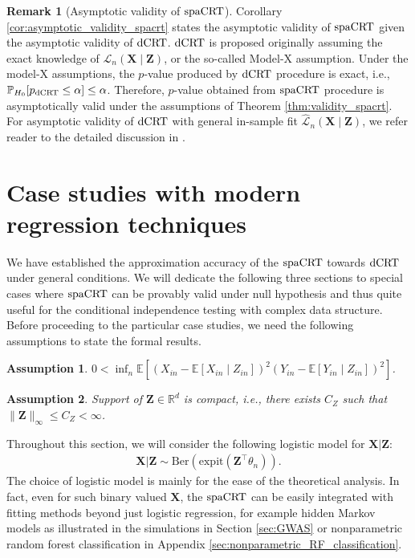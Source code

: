 \documentclass[12pt]{article}
\newtheorem{assumption}{Assumption}
\theoremstyle{definition}
\newtheorem{remark}{Remark}
\def\P{\mathbb{P}}
\def\P{\mathbb{P}}
\newcommand{\E}{\mathbb E}								%
\renewcommand{\P}{\mathbb{P}}							%
\newcommand{\expit}{\mathrm{expit}}                 	%
\newcommand{\prx}{\bm X}								%
\newcommand{\srx}{X}									%
\newcommand{\prz}{\bm Z}								%
\newcommand{\srz}{Z}									%
\newcommand{\sry}{Y}									%
\newcommand{\law}{\mathcal L}							%
\newcommand{\lawhat}{\widehat{\mathcal L}}				%
\newcommand{\dCRT}{\textnormal{dCRT}} 					%
\newcommand{\spacrt}{\textnormal{spaCRT}}               %
\begin{document}
\begin{remark}[Asymptotic validity of $\spacrt$]
	Corollary \ref{cor:asymptotic_validity_spacrt} states the asymptotic validity of $\spacrt$ given the asymptotic validity of $\dCRT$. $\dCRT$ is proposed originally assuming the exact knowledge of $\law_n(\prx\mid\prz)$, or the so-called Model-X assumption. Under the model-X assumptions, the $p$-value produced by $\dCRT$ procedure is exact, i.e., $\P_{H_0}[p_{\dCRT}\leq \alpha]\leq \alpha$. Therefore, $p$-value obtained from $\spacrt$ procedure is asymptotically valid under the assumptions of Theorem \ref{thm:validity_spacrt}. For asymptotic validity of $\dCRT$ with general in-sample fit $\lawhat_n(\prx\mid\prz)$, we refer reader to the detailed discussion in \citet{Niu2022a}.
\end{remark}


\section{Case studies with modern regression techniques}\label{sec:case_study}

We have established the approximation accuracy of the $\spacrt$ towards $\dCRT$ under general conditions. We will dedicate the following three sections to special cases where $\spacrt$ can be provably valid under null hypothesis and thus quite useful for the conditional independence testing with complex data structure. Before proceeding to the particular case studies, we need the following assumptions to state the formal results.
\begin{assumption}\label{assu:non_degeneracy_variance}
$0<\inf_n\E[(\srx_{in}-\E[\srx_{in}\mid \srz_{in}])^2(\sry_{in}-\E[\sry_{in}\mid \srz_{in}])^{2}]$.
\end{assumption}

\begin{assumption}\label{assu:compact_support_Z}
  Support of $\prz\in\mathbb{R}^d$ is compact, i.e., there exists $C_Z$ such that $\|\prz\|_{\infty}\leq C_Z<\infty$.
\end{assumption}

\noindent Throughout this section, we will consider the following logistic model for $\prx|\prz$:
\begin{align*}
  \prx|\prz\sim \mathrm{Ber}(\expit(\prz^\top \theta_n)).
\end{align*}
The choice of logistic model is mainly for the ease of the theoretical analysis. In fact, even for such binary valued $\prx$, the $\spacrt$ can be easily integrated with fitting methods beyond just logistic regression, for example hidden Markov models as illustrated in the simulations in Section \ref{sec:GWAS} or nonparametric random forest classification in Appendix \ref{sec:nonparametric_RF_classification}.  
\end{document}
